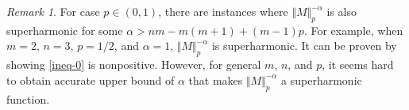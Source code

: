 \documentclass[11pt, a4paper]{article}
\theoremstyle{remark}
\newtheorem{remark}{Remark}
\begin{document}
\begin{remark}
    For case $p\in (0,1)$, there are instances where $\Vert M\Vert_{p}^{-\alpha}$ is also superharmonic for some $\alpha > nm-m(m+1)+(m-1)p$. For example, when $m=2$, $n=3$, $p=1/2$, and $\alpha=1$, $\Vert M\Vert_{p}^{-\alpha}$ is superharmonic. It can be proven by showing \eqref{ineq-0} is nonpositive. However, for general $m$, $n$, and $p$, it seems hard to obtain accurate upper bound of $\alpha$ that makes $\Vert M\Vert_{p}^{-\alpha}$ a superharmonic function.
\end{remark}



\end{document}
